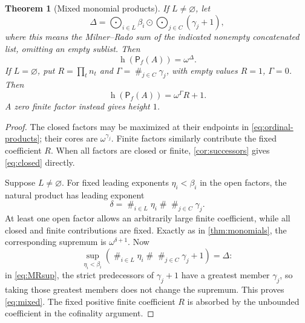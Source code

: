 \documentclass[11pt,letterpaper]{article}
\theoremstyle{teal}
\newtheorem{theorem}{Theorem}[section]
\theoremstyle{definition}
\newcommand{\Pf}{\mathsf P_{\!f}}
\newcommand{\hgt}{\operatorname{h}}
\newcommand{\nsum}{\mathbin{\#}}
\newcommand{\MR}{\mathbin{\odot}}
\begin{document}
\begin{theorem}[Mixed monomial products]\label{thm:mixed}
If $L\ne\varnothing$, let
\[
 \Delta=\mathop{\bigodot}_{i\in L}\beta_i
          \MR\mathop{\bigodot}_{j\in C}(\gamma_j+1),
\]
where this means the Milner--Rado sum of the indicated nonempty concatenated list, omitting an empty sublist. Then
\begin{equation}\label{eq:mixed}
 \hgt(\Pf(A))=\omega^\Delta.
\end{equation}
If $L=\varnothing$, put $R=\prod_t n_t$ and $\Gamma=\mathop{\#}_{j\in C}\gamma_j$, with empty values $R=1$, $\Gamma=0$. Then
\begin{equation}\label{eq:closed}
 \hgt(\Pf(A))=\omega^\Gamma R+1.
\end{equation}
A zero finite factor instead gives height $1$.
\end{theorem}
\begin{proof}
The closed factors may be maximized at their endpoints in \eqref{eq:ordinal-products}; their cores are $\omega^{\gamma_j}$. Finite factors similarly contribute the fixed coefficient $R$. When all factors are closed or finite, \cref{cor:successors} gives \eqref{eq:closed} directly.

Suppose $L\ne\varnothing$. For fixed leading exponents $\eta_i<\beta_i$ in the open factors, the natural product has leading exponent
\[
 \delta=\mathop{\#}_{i\in L}\eta_i\nsum\mathop{\#}_{j\in C}\gamma_j.
\]
At least one open factor allows an arbitrarily large finite coefficient, while all closed and finite contributions are fixed. Exactly as in \cref{thm:monomials}, the corresponding supremum is $\omega^{\delta+1}$. Now
\[
 \sup_{\eta_i<\beta_i}\left(
 \mathop{\#}_{i\in L}\eta_i\nsum\mathop{\#}_{j\in C}\gamma_j+1\right)=\Delta:
\]
in \eqref{eq:MRsup}, the strict predecessors of $\gamma_j+1$ have a greatest member $\gamma_j$, so taking those greatest members does not change the supremum. This proves \eqref{eq:mixed}. The fixed positive finite coefficient $R$ is absorbed by the unbounded coefficient in the cofinality argument.
\end{proof}
\end{document}
